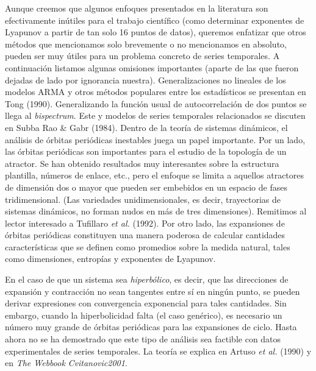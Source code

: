 \documentclass[10pt,a4paper]{book}
\begin{document}
Aunque creemos que algunos enfoques presentados en la literatura son efectivamente inútiles para el trabajo científico (como determinar exponentes de Lyapunov a partir de tan solo 16 puntos de datos), queremos enfatizar que otros métodos que mencionamos solo brevemente o no mencionamos en absoluto, pueden ser muy útiles para un problema concreto de series temporales. A continuación listamos algunas omisiones importantes (aparte de las que fueron dejadas de lado por ignorancia nuestra). Generalizaciones no lineales de los modelos ARMA y otros métodos populares entre los estadísticos se presentan en Tong (1990). Generalizando la función usual de autocorrelación de dos puntos se llega al \emph{bispectrum}. Este y modelos de series temporales relacionados se discuten en Subba Rao \& Gabr (1984). Dentro de la teoría de sistemas dinámicos, el análisis de órbitas periódicas inestables juega un papel importante. Por un lado, las órbitas periódicas son importantes para el estudio de la topología de un atractor. Se han obtenido resultados muy interesantes sobre la estructura plantilla, números de enlace, etc., pero el enfoque se limita a aquellos atractores de dimensión dos o mayor que pueden ser embebidos en un espacio de fases tridimensional. (Las variedades unidimensionales, es decir, trayectorias de sistemas dinámicos, no forman nudos en más de tres dimensiones). Remitimos al lector interesado a Tufillaro \emph{et al.} (1992). Por otro lado, las expansiones de órbitas periódicas constituyen una manera poderosa de calcular cantidades características que se definen como promedios sobre la medida natural, tales como dimensiones, entropías y exponentes de Lyapunov. 

En el caso de que un sistema sea \emph{hiperbólico}, es decir, que las direcciones de expansión y contracción no sean tangentes entre sí en ningún punto, se pueden derivar expresiones con convergencia exponencial para tales cantidades. Sin embargo, cuando la hiperbolicidad falta (el caso genérico), es necesario un número muy grande de órbitas periódicas para las expansiones de ciclo. Hasta ahora no se ha demostrado que este tipo de análisis sea factible con datos experimentales de series temporales. La teoría se explica en Artuso \emph{et al.} (1990) y en \emph{The Webbook} \textit{Cvitanovic2001}.
\end{document}
